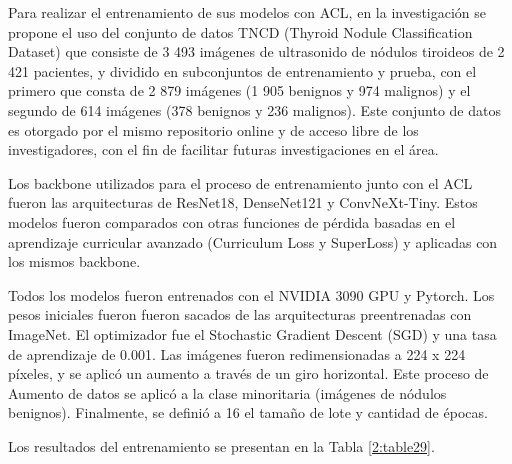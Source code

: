 Para realizar el entrenamiento de sus modelos con ACL, en la investigación se propone el uso del conjunto de datos TNCD (Thyroid Nodule Classification Dataset) que consiste de 3 493 imágenes de ultrasonido de nódulos tiroideos de 2 421 pacientes, y dividido en subconjuntos de entrenamiento y prueba, con el primero que consta de 2 879 imágenes (1 905 benignos y 974 malignos) y el segundo de 614 imágenes (378 benignos y 236 malignos). Este conjunto de datos es otorgado por el mismo repositorio online y de acceso libre de los investigadores, con el fin de facilitar futuras investigaciones en el área.

Los backbone utilizados para el proceso de entrenamiento junto con el ACL fueron las arquitecturas de ResNet18, DenseNet121 y ConvNeXt-Tiny. Estos modelos fueron comparados con otras funciones de pérdida basadas en el aprendizaje curricular avanzado (Curriculum Loss y SuperLoss) y aplicadas con los mismos backbone.

Todos los modelos fueron entrenados con el NVIDIA 3090 GPU y Pytorch. Los pesos iniciales fueron fueron sacados de las arquitecturas preentrenadas con ImageNet. El optimizador fue el Stochastic Gradient Descent (SGD) y una tasa de aprendizaje de 0.001. Las imágenes fueron redimensionadas a 224 x 224 píxeles, y se aplicó un aumento a través de un giro horizontal. Este proceso de Aumento de datos se aplicó a la clase minoritaria (imágenes de nódulos benignos). Finalmente, se definió a 16 el tamaño de lote y cantidad de épocas.

Los resultados del entrenamiento se presentan en la Tabla \ref{2:table29}.

